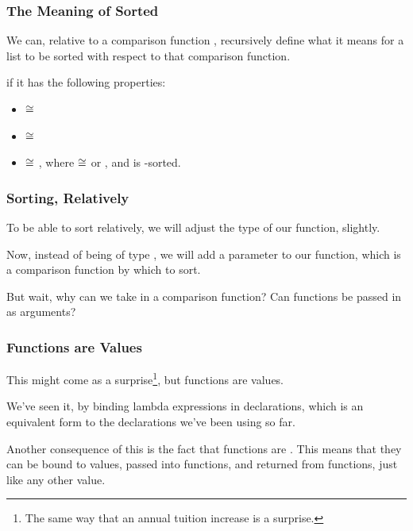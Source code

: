 \documentclass[aspectratio=169]{beamer}
\begin{document}
\begin{frame}[fragile]
  \frametitle{The Meaning of Sorted}

  \rprs

  We can, relative to a comparison function , recursively
  define what it means for a list to be sorted with respect to that comparison
  function.

  \pause
  \vspace{\fill}

   if
  it has the following properties:

  \pause
  \begin{itemize}
    \item {} $\cong$ \code{[]}
    \item {} $\cong$ \code{[x]}
    \item {} $\cong$ , where  $\cong$
     or , and  is -sorted.
  \end{itemize}
\end{frame}

\begin{frame}[fragile]
  \frametitle{Sorting, Relatively}

  To be able to sort relatively, we will adjust the type of our 
  function, slightly.

  \pause
  \vspace{\fill}

  Now, instead of being of type , we will add a parameter
  to our  function, which is a comparison function by which to sort.

  \pause
  \vspace{\fill}

  But wait, why can we take in a comparison function? Can functions be passed in as arguments?
\end{frame}

\begin{frame}[fragile]
  \frametitle{Functions are Values}

  This might come as a surprise\footnote{The same way that an annual tuition increase is a surprise.},
  but functions are values.

  \pause
  \vspace{\fill}

  We've seen it, by binding lambda expressions in  declarations, which
  is an equivalent form to the  declarations we've been using so far.

  \pause
  \vspace{\fill}

  Another consequence of this is the fact that functions are .
  This means that they can be bound to values, passed into functions, and returned
  from functions, just like any other value.
\end{frame}
\end{document}
